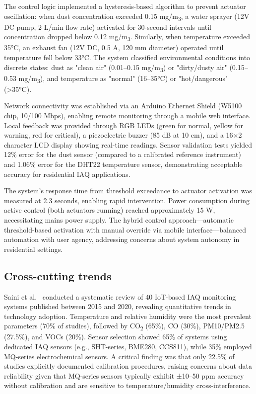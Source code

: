\documentclass[12pt]{report}
\begin{document}
The control logic implemented a hysteresis-based algorithm to prevent actuator oscillation: when dust concentration exceeded 0.15 mg/m\textsubscript{3}, a water sprayer (12V DC pump, 2 L/min flow rate) activated for 30-second intervals until concentration dropped below 0.12 mg/m\textsubscript{3}. Similarly, when temperature exceeded 35°C, an exhaust fan (12V DC, 0.5 A, 120 mm diameter) operated until temperature fell below 33°C. The system classified environmental conditions into discrete states: dust as "clean air" (0.01--0.15 mg/m\textsubscript{3}) or "dirty/dusty air" (0.15--0.53 mg/m\textsubscript{3}), and temperature as "normal" (16--35°C) or "hot/dangerous" (>35°C).

Network connectivity was established via an Arduino Ethernet Shield (W5100 chip, 10/100 Mbps), enabling remote monitoring through a mobile web interface. Local feedback was provided through RGB LEDs (green for normal, yellow for warning, red for critical), a piezoelectric buzzer (85 dB at 10 cm), and a 16×2 character LCD display showing real-time readings. Sensor validation tests yielded 12\% error for the dust sensor (compared to a calibrated reference instrument) and 1.06\% error for the DHT22 temperature sensor, demonstrating acceptable accuracy for residential IAQ applications.

The system's response time from threshold exceedance to actuator activation was measured at 2.3 seconds, enabling rapid intervention. Power consumption during active control (both actuators running) reached approximately 15 W, necessitating mains power supply. The hybrid control approach—automatic threshold-based activation with manual override via mobile interface—balanced automation with user agency, addressing concerns about system autonomy in residential settings.

\subsection{Cross-cutting trends}
Saini et al.~\cite{saini2020} conducted a systematic review of 40 IoT-based IAQ monitoring systems published between 2015 and 2020, revealing quantitative trends in technology adoption. Temperature and relative humidity were the most prevalent parameters (70\% of studies), followed by CO\textsubscript{2} (65\%), CO (30\%), PM10/PM2.5 (27.5\%), and VOCs (20\%). Sensor selection showed 65\% of systems using dedicated IAQ sensors (e.g., SHT-series, BME280, CCS811), while 35\% employed MQ-series electrochemical sensors. A critical finding was that only 22.5\% of studies explicitly documented calibration procedures, raising concerns about data reliability given that MQ-series sensors typically exhibit ±10--50 ppm accuracy without calibration and are sensitive to temperature/humidity cross-interference.
\end{document}
